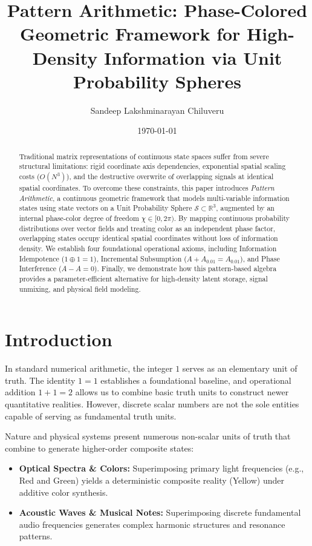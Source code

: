 \documentclass[12pt, a4paper]{article}
\title{Pattern Arithmetic: Phase-Colored Geometric Framework for High-Density Information via Unit Probability Spheres}
\author{Sandeep Lakshminarayan Chiluveru}
\date{\today}
\begin{document}
\maketitle

\begin{abstract}
Traditional matrix representations of continuous state spaces suffer from severe structural limitations: rigid coordinate axis dependencies, exponential spatial scaling costs ($O(N^3)$), and the destructive overwrite of overlapping signals at identical spatial coordinates. To overcome these constraints, this paper introduces \textit{Pattern Arithmetic}, a continuous geometric framework that models multi-variable information states using state vectors on a Unit Probability Sphere $\mathcal{S} \subset \mathbb{R}^3$, augmented by an internal phase-color degree of freedom $\chi \in [0, 2\pi)$. By mapping continuous probability distributions over vector fields and treating color as an independent phase factor, overlapping states occupy identical spatial coordinates without loss of information density. We establish four foundational operational axioms, including Information Idempotence ($1 \oplus 1 = 1$), Incremental Subsumption ($A + A_{0.01} = A_{0.01}$), and Phase Interference ($A - A = 0$). Finally, we demonstrate how this pattern-based algebra provides a parameter-efficient alternative for high-density latent storage, signal unmixing, and physical field modeling.
\end{abstract}

\section{Introduction}

In standard numerical arithmetic, the integer $1$ serves as an elementary unit of truth. The identity $1 = 1$ establishes a foundational baseline, and operational addition $1 + 1 = 2$ allows us to combine basic truth units to construct newer quantitative realities. However, discrete scalar numbers are not the sole entities capable of serving as fundamental truth units.

Nature and physical systems present numerous non-scalar units of truth that combine to generate higher-order composite states:
\begin{itemize}
    \item \textbf{Optical Spectra \& Colors:} Superimposing primary light frequencies (e.g., Red and Green) yields a deterministic composite reality (Yellow) under additive color synthesis.
    \item \textbf{Acoustic Waves \& Musical Notes:} Superimposing discrete fundamental audio frequencies generates complex harmonic structures and resonance patterns.
\end{itemize}
\end{document}
